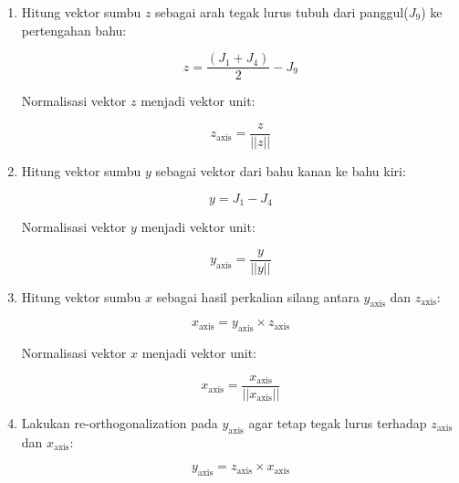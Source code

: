 \begin{enumerate}
    \item Hitung vektor sumbu $z$ sebagai arah tegak lurus tubuh dari panggul($J_{9}$) ke pertengahan bahu:
    
    \begin{equation}
    {z} = \frac{(J_1 + J_4)}{2} - J_9
    \end{equation}
    
    Normalisasi vektor $z$ menjadi vektor unit:
    
    \begin{equation}
    {z}_{\text{axis}} = \frac{{z}}{||{z}||}
    \end{equation}
    
    \item Hitung vektor sumbu $y$ sebagai vektor dari bahu kanan ke bahu kiri:
    
    \begin{equation}
    {y} = J_1 - J_4
    \end{equation}
    
    Normalisasi vektor $y$ menjadi vektor unit:
    
    \begin{equation}
    {y}_{\text{axis}} = \frac{{y}}{||{y}||}
    \end{equation}
    
    \item Hitung vektor sumbu $x$ sebagai hasil perkalian silang antara ${y}_{\text{axis}}$ dan ${z}_{\text{axis}}$:
    
    \begin{equation}
    {x}_{\text{axis}} = {y}_{\text{axis}} \times {z}_{\text{axis}}
    \end{equation}
    
    Normalisasi vektor $x$ menjadi vektor unit:
    
    \begin{equation}
    {x}_{\text{axis}} = \frac{{x}_{\text{axis}}}{||{x}_{\text{axis}}||}
    \end{equation}
    
    \item Lakukan re-orthogonalization pada ${y}_{\text{axis}}$ agar tetap tegak lurus terhadap ${z}_{\text{axis}}$ dan ${x}_{\text{axis}}$:
    
    \begin{equation}
    {y}_{\text{axis}} = {z}_{\text{axis}} \times {x}_{\text{axis}}
    \end{equation}
    

\end{enumerate}
